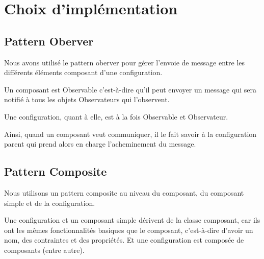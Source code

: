 \section{Choix d'implémentation}
\subsection{Pattern Oberver}
Nous avons utilisé le pattern oberver pour gérer l'envoie de message entre les
différents éléments composant d'une configuration.

Un composant est Observable c'est-à-dire qu'il peut envoyer un message qui sera
notifié à tous les objets Observateurs qui l'observent.

Une configuration, quant à elle, est à la fois Observable et Observateur.

Ainsi, quand un composant veut communiquer, il le fait savoir à la configuration
parent qui prend alors en charge l'acheminement du message.

\subsection{Pattern Composite}
Nous utilisons un pattern composite au niveau du composant, du composant simple
et de la configuration.

Une configuration et un composant simple dérivent de la classe composant, car
ils ont les mêmes fonctionnalités basiques que le composant, c'est-à-dire
d'avoir un nom, des contraintes et des propriétés. Et une configuration est
composée de composants (entre autre).

\clearpage
